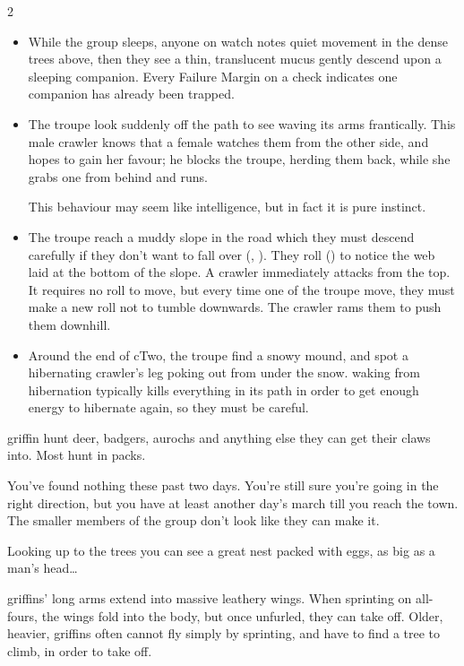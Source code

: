 \begin{multicols}{2}
\null

\begin{itemize}
  \item
  While the group sleeps, anyone on watch notes quiet movement in the dense trees above, then they see a thin, translucent mucus gently descend upon a sleeping companion.
  Every Failure Margin on a  check indicates one companion has already been trapped.
  \item
    The troupe look suddenly off the path to see  waving its arms frantically.
    This male \gls{crawler} knows that a female watches them from the other side, and hopes to gain her favour; he blocks the troupe, herding them back, while she grabs one from behind and runs.

  This behaviour may seem like intelligence, but in fact it is pure instinct.
  \item
  The troupe reach a muddy slope in the road which they must descend carefully if they don't want to fall over (, \tn[7]).
  They roll  (\tn[8]) to notice the web laid at the bottom of the slope.
  A \gls{crawler} immediately attacks from the top.
  It requires no roll to move, but every time one of the troupe move, they must make a new roll not to tumble downwards.
  The \gls{crawler} rams them to push them downhill.
  \item
  Around the end of \gls{cTwo}, the troupe find a snowy mound, and spot a hibernating \gls{crawler}'s leg poking out from under the snow.
   waking from hibernation typically kills everything in its path in order to get enough energy to hibernate again, so they must be careful.
\end{itemize}

  {griffin}%
hunt deer, badgers, aurochs and anything else they can get their claws into.
Most hunt in packs.

\begin{boxtext}
  You've found nothing these past two days.
  You're still sure you're going in the right direction, but you have at least another day's march till you reach the town.
  The smaller members of the group don't look like they can make it.

  Looking up to the trees you can see a great nest packed with eggs, as big as a man's head\ldots
\end{boxtext}

\Glspl{griffin}' long arms extend into massive leathery wings.
When sprinting on all-fours, the wings fold into the body, but once unfurled, they can take off.
Older, heavier, \glspl{griffin} often cannot fly simply by sprinting, and have to find a tree to climb, in order to take off.


\end{multicols}

